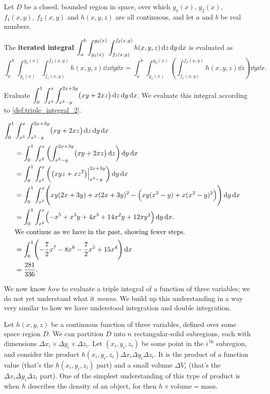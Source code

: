 {
\begin{definition}\label{def:triple_integral_2}%
Let $D$ be a closed, bounded region in space, over which $g_1(x)$, $g_2(x)$, $f_1(x,y)$, $f_2(x,y)$ and $h(x,y,z)$ are all continuous, and let $a$ and $b$ be real numbers.\bigskip

The \textbf{iterated integral} $\displaystyle \int_a^b\int_{g_1(x)}^{g_2(x)}\int_{f_1(x,y)}^{f_2(x,y)} h(x,y,z)\operatorname{d}\! z\operatorname{d}\! y\operatorname{d}\! x$ is evaluated as
\small
\[
\int_a^b\int_{g_1(x)}^{g_2(x)}\int_{f_1(x,y)}^{f_2(x,y)} h(x,y,z)\dd z\dd y\dd x
= \int_a^b\int_{g_1(x)}^{g_2(x)}\left(\int_{f_1(x,y)}^{f_2(x,y)} h(x,y,z)\dd z\right)\dd y\dd x.
\]
\end{definition}}

\begin{example}\label{ex_trip6}%
Evaluate $\displaystyle \int_0^1\int_{x^2}^x\int_{x^2-y}^{2x+3y} \bigl(xy+2xz\bigr)\operatorname{d}\! z\operatorname{d}\! y\operatorname{d}\! x$.
\solution
We evaluate this integral according to \autoref{def:triple_integral_2}.\bigskip

$\displaystyle \int_0^1\int_{x^2}^x\int_{x^2-y}^{2x+3y} \bigl(xy+2xz\bigr)\operatorname{d}\! z\operatorname{d}\! y\operatorname{d}\! x $
\begin{align*}
			&=	\int_0^1\int_{x^2}^x\left(\int_{x^2-y}^{2x+3y} \bigl(xy+2xz\bigr)\dd z\right)\dd y\dd x\\
			&= \int_0^1\int_{x^2}^x\left(\bigl(xyz+ xz^2\bigr)\Big|_{x^2-y}^{2x+3y}\right)\dd y\dd x\\
			&= \int_0^1\int_{x^2}^x\Biggl(xy(2x+3y)+x(2x+3y)^2-\Bigl(xy(x^2-y)+x(x^2-y)^2\Bigr)\Biggr)\dd y\dd x\\
			&=\int_0^1\int_{x^2}^x\Bigl(-x^5+x^3y+4x^3+14x^2y+12xy^2\Bigr)\dd y\dd x.\\
			\intertext{We continue as we have in the past, showing fewer steps.}
			&= \int_0^1\Biggl(-\frac72x^7-8x^6-\frac72x^5+15x^4\Biggr)\dd x\\
			&= \frac{281}{336}%
			.
\end{align*}
\end{example}

We now know \emph{how} to evaluate a triple integral of a function of three variables; we do not yet understand what it \emph{means}. We build up this understanding in a way very similar to how we have understood integration and double integration.

Let $h(x,y,z)$ be a continuous function of three variables, defined over some space region $D$. We can partition $D$ into $n$ rectangular-solid subregions, each with dimensions $\Delta x_i\times\Delta y_i\times\Delta z_i$. Let $(x_i,y_i,z_i)$ be some point in the $i^{\,\text{th}}$ subregion, and consider the product $h(x_i,y_i,z_i)\Delta x_i\Delta y_i\Delta z_i$. It is the product of a function value (that's the $h(x_i,y_i,z_i)$ part) and a small volume $\Delta V_i$ (that's the $\Delta x_i\Delta y_i\Delta z_i$ part). One of the simplest understanding of this type of product is when $h$ describes the density of an object, for then $h\times\text{volume}=\text{mass}$.

